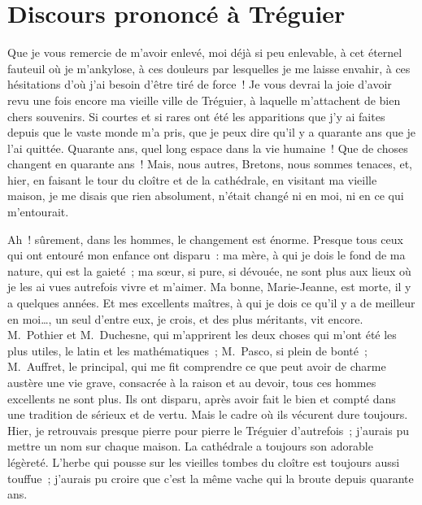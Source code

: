 \documentclass[french,twoside]{book} %
\newcommand\orgName[1]{#1}
\newcommand\persName[1]{#1}
\newcommand\placeName[1]{#1}
\newcommand{\dateline}[1]{\medskip{\RaggedLeft{#1}\par}\bigskip}
\newcommand{\salute}[1]{\bigbreak{#1}\par\medbreak}
\begin{document}
\section[{Discours prononcé à Tréguier}]{Discours prononcé à {\placeName Tréguier}}\renewcommand{\leftmark}{Discours prononcé à {\placeName Tréguier}}


\dateline{2 août 1884}

\salute{Messieurs et amis,}
\noindent Que je vous remercie de m’avoir enlevé, moi déjà si peu enlevable, à cet éternel fauteuil où je m’ankylose, à ces douleurs par lesquelles je me laisse envahir, à ces hésitations d’où j’ai besoin d’être tiré de force ! Je vous devrai la joie d’avoir revu une fois encore ma vieille ville de {\placeName Tréguier}, à laquelle m’attachent de bien chers souvenirs. Si courtes et si rares ont été les apparitions que j’y ai faites depuis que le vaste monde m’a pris, que je peux dire qu’il y a quarante ans que je l’ai quittée. Quarante ans, quel long espace dans la vie humaine ! Que de choses changent en quarante ans ! Mais, nous autres, {\orgName Bretons}, nous sommes tenaces, et, hier, en faisant le tour du cloître et de la cathédrale, en visitant ma vieille maison, je me disais que rien absolument, n’était changé ni en moi, ni en ce qui m’entourait.\par
Ah ! sûrement, dans les hommes, le changement est énorme. Presque tous ceux qui ont entouré mon enfance ont disparu : ma mère, à qui je dois le fond de ma nature, qui est la gaieté ; ma sœur, si pure, si dévouée, ne sont plus aux lieux où je les ai vues autrefois vivre et m’aimer. Ma bonne, Marie-Jeanne, est morte, il y a quelques années. Et mes excellents maîtres, à qui je dois ce qu’il y a de meilleur en moi…, un seul d’entre eux, je crois, et des plus méritants, vit encore. {\persName M. Pothier} et {\persName M. Duchesne}, qui m’apprirent les deux choses qui m’ont été les plus utiles, le latin et les mathématiques ; {\persName M. Pasco}, si plein de bonté ; {\persName M. Auffret}, le principal, qui me fit comprendre ce que peut avoir de charme austère une vie grave, consacrée à la raison et au devoir, tous ces hommes excellents ne sont plus. Ils ont disparu, après avoir fait le bien et compté dans une tradition de sérieux et de vertu. Mais le cadre où ils vécurent dure toujours. Hier, je retrouvais presque pierre pour pierre le {\placeName Tréguier} d’autrefois ; j’aurais pu mettre un nom sur chaque maison. La cathédrale a toujours son adorable légèreté. L’herbe qui pousse sur les vieilles tombes du cloître est toujours aussi touffue ; j’aurais pu croire que c’est la même vache qui la broute depuis quarante ans.\par
\end{document}
